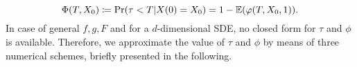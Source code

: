 \begin{equation}\label{eq:ExitProb}
	\Phi(T,X_0) \coloneqq \Pr(\tau < T | X(0) = X_0) = 1 - \mathbb{E}(\varphi(T,X_0,1)). 
\end{equation}
In case of general $f,g,F$ and for a $d$-dimensional SDE, no closed form for $\tau$ and $\phi$ is available. Therefore, we approximate the value of $\tau$ and $\phi$ by means of three numerical schemes, briefly presented in the following.





